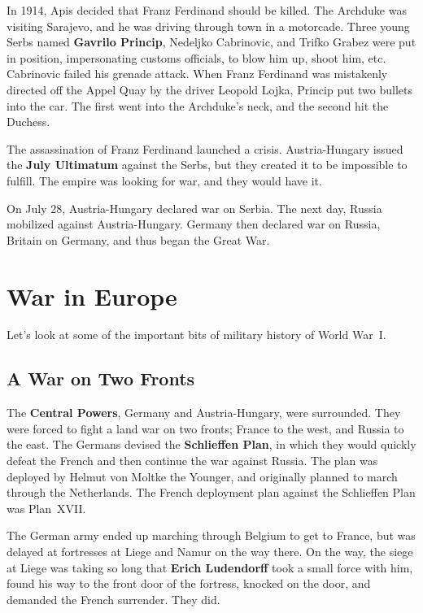 In 1914, Apis decided that Franz Ferdinand should be killed.
The Archduke was visiting Sarajevo, and he was driving through town in a motorcade.
Three young Serbs named \textbf{Gavrilo Princip}, Nedeljko Cabrinovic, and Trifko Grabez
were put in position, impersonating customs officials, to blow him up, shoot him, etc.
Cabrinovic failed his grenade attack.
When Franz Ferdinand was mistakenly directed off the Appel Quay by the driver Leopold Lojka,
Princip put two bullets into the car.
The first went into the Archduke's neck, and the second hit the Duchess.

The assassination of Franz Ferdinand launched a crisis.
Austria-Hungary issued the \textbf{July Ultimatum} against the Serbs,
but they created it to be impossible to fulfill.
The empire was looking for war, and they would have it.

On July 28, Austria-Hungary declared war on Serbia.
The next day, Russia mobilized against Austria-Hungary.
Germany then declared war on Russia,
Britain on Germany,
and thus began the Great War.

\section{War in Europe}

Let's look at some of the important bits of military history of World War~I\@.

\subsection*{A War on Two Fronts}

The \textbf{Central Powers}, Germany and Austria-Hungary, were surrounded.
They were forced to fight a land war on two fronts; France to the west, and Russia to the east.
The Germans devised the \textbf{Schlieffen Plan},
in which they would quickly defeat the French and then continue the war against Russia.
The plan was deployed by Helmut von Moltke the Younger,
and originally planned to march through the Netherlands.
The French deployment plan against the Schlieffen Plan was Plan~XVII\@.

The German army ended up marching through Belgium to get to France,
but was delayed at fortresses at Liege and Namur on the way there.
On the way,
the siege at Liege was taking so long that \textbf{Erich Ludendorff} took a small force with him,
found his way to the front door of the fortress,
knocked on the door, and demanded the French surrender.
They did.

